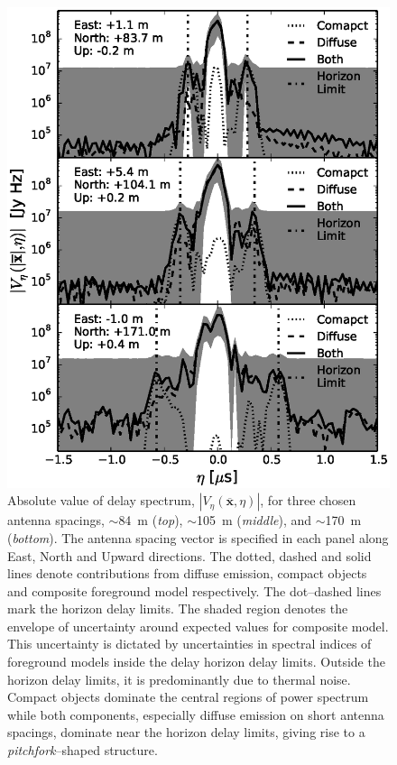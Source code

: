 \documentclass[preprint2,iop,numberedappendix]{emulateapj}
\begin{document}
\begin{figure}[htb]
\centering
\includegraphics[width=\linewidth]{figures/v1_0/delta_array_3_baseline_comparison_visibilities_0.3m_ground_custom_gaussian_FG_model_csm_all_sky_nside_64_Tsys_90.0K_185.0_MHz_30.7_MHz_bnw2.0.eps}
\caption{Absolute value of delay spectrum, $|V_\eta(\overline{\mathbf{x}},\eta)|$, for three chosen antenna spacings, $\sim$84~m ({\it top}), $\sim$105~m ({\it middle}), and $\sim$170~m ({\it bottom}). The antenna spacing vector is specified in each panel along East, North and Upward directions. The dotted, dashed and solid lines denote contributions from diffuse emission, compact objects and composite foreground model respectively. The dot--dashed lines mark the horizon delay limits. The shaded region denotes the envelope of uncertainty around expected values for composite model. This uncertainty is dictated by uncertainties in spectral indices of foreground models inside the delay horizon delay limits. Outside the horizon delay limits, it is predominantly due to thermal noise. Compact objects dominate the central regions of power spectrum while both components, especially diffuse emission on short antenna spacings, dominate near the horizon delay limits, giving rise to a {\it pitchfork}--shaped structure. \label{fig:pitchfork-baselines}}
\end{figure}
\end{document}
